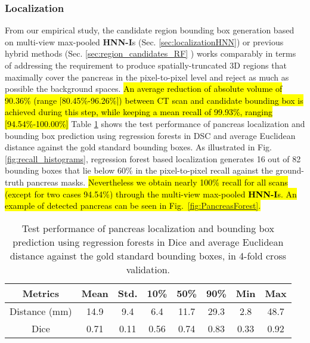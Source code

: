 \documentclass[journal]{IEEEtran}
\begin{document}
\subsubsection{Localization}
From our empirical study, the candidate region bounding box generation based on multi-view max-pooled \textbf{HNN-I}s (Sec. \ref{sec:localizationHNN}) or previous hybrid methods (Sec. \ref{sec:region_candidates_RF} \cite{farag2014bottom}) works comparably in terms of addressing the requirement to produce spatially-truncated 3D regions that maximally cover the pancreas in the pixel-to-pixel level and reject as much as possible the background spaces. \hl{An average reduction of absolute volume of 90.36\% (range [80.45\%-96.26\%]) between CT scan and candidate bounding box is achieved during this step, while keeping a mean recall of 99.93\%, ranging [94.54\%-100.00\%]} Table \ref{tbl:PancreasForestPerformance} shows the test performance of pancreas localization and bounding box prediction using regression forests in DSC and average Euclidean distance against the gold standard bounding boxes. As illustrated in Fig. \ref{fig:recall_histograms}, regression forest based localization generates 16 out of 82 bounding boxes that lie below 60\% in the pixel-to-pixel recall against the ground-truth pancreas masks. \hl{Nevertheless we obtain nearly 100\% recall for all scans (except for two cases 94.54\%) through the multi-view max-pooled \textbf{HNN-I}s. An example of detected pancreas can be seen in Fig.~\ref{fig:PancreasForest}.}
\begin{table}[H]
\centering
\begin{tabular}{c|c|c|c|c|c|c|c}
	\toprule
	\toprule
Metrics & Mean & Std. & 10\% & 50\% & 90\% & Min & Max \\
	\midrule       
Distance (mm) & 14.9 & 9.4 & 6.4 & 11.7 & 29.3 & 2.8 & 48.7 \\
Dice & 0.71 & 0.11 & 0.56 & 0.74 & 0.83 & 0.33 & 0.92 \\
	\bottomrule
	\bottomrule
\end{tabular}
\caption{\small Test performance of pancreas localization and bounding box prediction using regression forests in Dice and average Euclidean distance against the gold standard bounding boxes, in 4-fold cross validation.} 
\label{tbl:PancreasForestPerformance}
\end{table}
\end{document}
